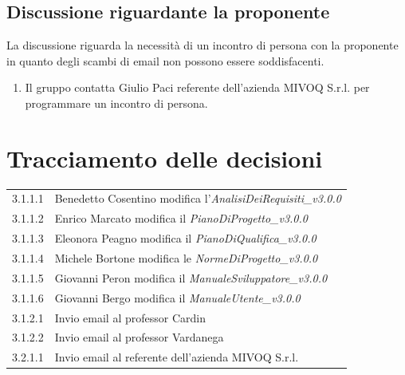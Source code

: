 \documentclass[11pt,a4paper]{article}
\begin{document}
	\subsection{Discussione riguardante la proponente}
	La discussione riguarda la necessità di un incontro di persona con la proponente in quanto degli scambi di email non possono essere soddisfacenti.
		\begin{enumerate}
			\item Il gruppo contatta Giulio Paci referente dell'azienda MIVOQ S.r.l. per programmare un incontro di persona.
	
		\end{enumerate}
	
	\section{Tracciamento delle decisioni}
	
	\begin{tabular}{|l|l|}\hline
		3.1.1.1 & Benedetto Cosentino modifica l'\textit{AnalisiDeiRequisiti\_v3.0.0} \\
		3.1.1.2 & Enrico Marcato modifica il \textit{PianoDiProgetto\_v3.0.0}\\
		3.1.1.3 & Eleonora Peagno modifica il \textit{PianoDiQualifica\_v3.0.0}\\
		3.1.1.4 & Michele Bortone modifica le \textit{NormeDiProgetto\_v3.0.0} \\ 
		3.1.1.5 & Giovanni Peron modifica il \textit{ManualeSviluppatore\_v3.0.0} \\ 
		3.1.1.6 & Giovanni Bergo modifica il \textit{ManualeUtente\_v3.0.0} \\ 
		3.1.2.1 & Invio email al professor Cardin\\
		3.1.2.2 & Invio email al professor Vardanega\\
		3.2.1.1 & Invio email al referente dell'azienda MIVOQ S.r.l.\\
		\hline 
	\end{tabular}
	
	
\end{document}
